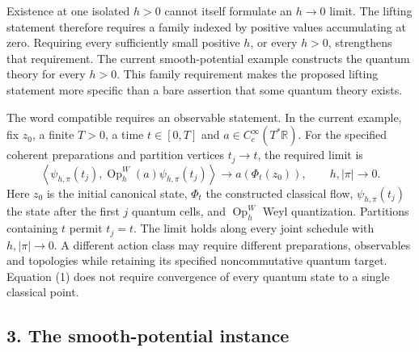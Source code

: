 \documentclass[11pt,a4paper]{article}
\begin{document}
Existence at one isolated \(h>0\) cannot itself formulate an \(h\to0\)
limit. The lifting statement therefore requires a family indexed by
positive values accumulating at zero. Requiring every sufficiently small
positive \(h\), or every \(h>0\), strengthens that requirement. The
current smooth-potential example constructs the quantum theory for every
\(h>0\). This family requirement makes the proposed lifting statement
more specific than a bare assertion that some quantum theory exists.

The word compatible requires an observable statement. In the current
example, fix \(z_0\), a finite \(T>0\), a time \(t\in[0,T]\) and
\(a\in C_c^\infty(T^*\mathbb R)\). For the specified coherent
preparations and partition vertices \(t_j\to t\), the required limit is
\[
 \left\langle\psi_{h,\pi}(t_j),
       \operatorname{Op}_h^W(a)\psi_{h,\pi}(t_j)\right\rangle
 \longrightarrow a(\Phi_t(z_0)),
 \qquad h,|\pi|\longrightarrow0. \tag{1}
\] Here \(z_0\) is the initial canonical state, \(\Phi_t\) the
constructed classical flow, \(\psi_{h,\pi}(t_j)\) the state after the
first \(j\) quantum cells, and \(\operatorname{Op}_h^W\) Weyl
quantization. Partitions containing \(t\) permit \(t_j=t\). The limit
holds along every joint schedule with \(h,|\pi|\to0\). A different
action class may require different preparations, observables and
topologies while retaining its specified noncommutative quantum target.
Equation (1) does not require convergence of every quantum state to a
single classical point.

\hypertarget{the-smooth-potential-instance}{%
\subsection{3. The smooth-potential
instance}\label{the-smooth-potential-instance}}
\end{document}
